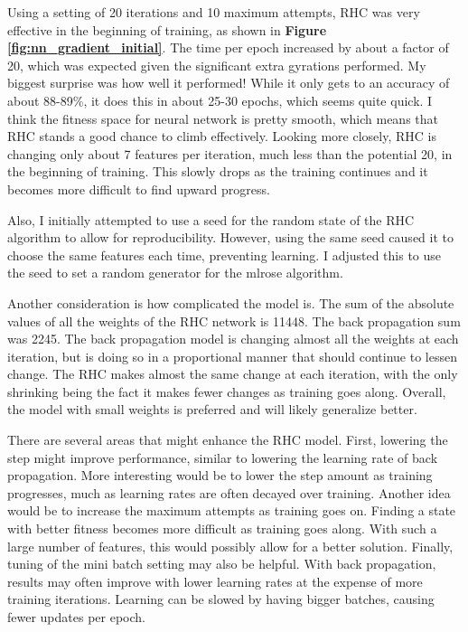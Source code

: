 \documentclass[letterpaper]{article} %
\begin{document}
Using a setting of 20 iterations and 10 maximum attempts, RHC was very effective in the beginning of training, as shown in \textbf{Figure \ref{fig:nn_gradient_initial}}.  The time per epoch increased by about a factor of 20, which was expected given the significant extra gyrations performed.  My biggest surprise was how well it performed!  While it only gets to an accuracy of about 88-89\%, it does this in about 25-30 epochs, which seems quite quick.  I think the fitness space for neural network is pretty smooth, which means that RHC stands a good chance to climb effectively.  Looking more closely, RHC is changing only about 7 features per iteration, much less than the potential 20, in the beginning of training.  This slowly drops as the training continues and it becomes more difficult to find upward progress.  

Also, I initially attempted to use a seed for the random state of the RHC algorithm to allow for reproducibility.  However, using the same seed caused it to choose the same features each time, preventing learning.  I adjusted this to use the seed to set a random generator for the mlrose algorithm.

Another consideration is how complicated the model is.   The sum of the absolute values of all the weights of the RHC network is 11448.  The back propagation sum was 2245.  The back propagation model is changing almost all the weights at each iteration, but is doing so in a proportional manner that should continue to lessen change.  The RHC makes almost the same change at each iteration, with the only shrinking being the fact it makes fewer changes as training goes along.  Overall, the model with small weights is preferred and will likely generalize better. 

There are several areas that might enhance the RHC model. First, lowering the step might improve performance, similar to lowering the learning rate of back propagation.  More interesting would be to lower the step amount as training progresses,  much as learning rates are often decayed over training.  Another idea would be to increase the maximum attempts as training goes on.  Finding a state with better fitness becomes more difficult as training goes along. With such a large number of features,  this would possibly allow for a better solution.  Finally, tuning of the mini batch setting may also be helpful.  With back propagation, results may often improve with lower learning rates at the expense of more training iterations.  Learning can be slowed by having bigger batches, causing fewer updates per epoch.  
\end{document}
